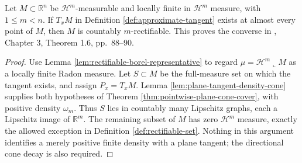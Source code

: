 \begin{theorem}\label{thm:rectifiable-converse-tangents}
Let $M\subset\mathbb R^n$ be $\mathcal H^m$-measurable and locally finite in $\mathcal H^m$ measure, with $1\leq m<n$. If $T_xM$ in Definition \ref{def:approximate-tangent} exists at almost every point of $M$, then $M$ is countably $m$-rectifiable. This proves the converse in \cite{Sim18}, Chapter 3, Theorem 1.6, pp.~88--90.
\end{theorem}
\begin{proof}
Use Lemma \ref{lem:rectifiable-borel-representative} to regard $\mu=\mathcal H^m\llcorner M$ as a locally finite Radon measure. Let $S\subset M$ be the full-measure set on which the tangent exists, and assign $P_x=T_xM$. Lemma \ref{lem:plane-tangent-density-cone} supplies both hypotheses of Theorem \ref{thm:pointwise-plane-cone-cover}, with positive density $\omega_m$. Thus $S$ lies in countably many Lipschitz graphs, each a Lipschitz image of $\mathbb R^m$. The remaining subset of $M$ has zero $\mathcal H^m$ measure, exactly the allowed exception in Definition \ref{def:rectifiable-set}. Nothing in this argument identifies a merely positive finite density with a plane tangent; the directional cone decay is also required.
\end{proof}
